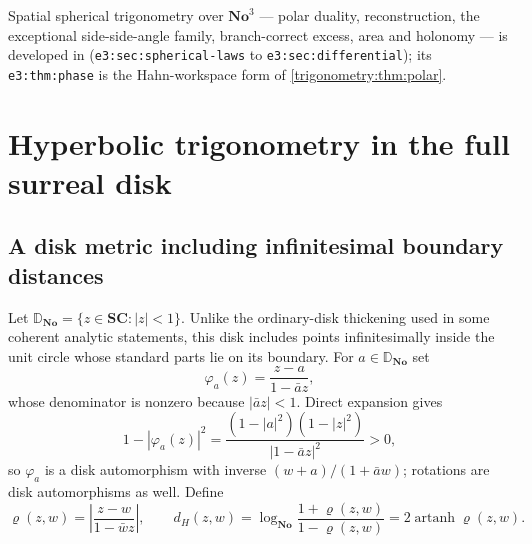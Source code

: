 \documentclass[11pt,letterpaper]{article}
\numberwithin{equation}{section}
\theoremstyle{definition}
\theoremstyle{remark}
\newcommand{\No}{\mathbf{No}}
\newcommand{\SC}{\mathbf{SC}}
\newcommand{\Dd}{\mathbb D}
\newcommand{\artanh}{\operatorname{artanh}}
\begin{document}
{\raggedright Spatial spherical trigonometry over $\No^3$ --- polar duality, reconstruction,
the exceptional side-side-angle family, branch-correct excess, area and
holonomy --- is developed in 
(\texttt{e3:sec:spherical-laws} to \texttt{e3:sec:differential}); its
\texttt{e3:thm:phase} is the Hahn-workspace form of
\cref{trigonometry:thm:polar}.\par}
\section{Hyperbolic trigonometry in the full surreal disk}
\label{trigonometry:sec:hyperbolic}

\subsection{A disk metric including infinitesimal boundary distances}
Let $\Dd_{\No}=\{z\in\SC:|z|<1\}$. Unlike the ordinary-disk thickening used in some coherent
analytic statements, this disk includes points infinitesimally inside the unit circle whose
standard parts lie on its boundary. For $a\in\Dd_{\No}$ set
\begin{equation}\label{trigonometry:eq:diskmap}
 \varphi_a(z)=\frac{z-a}{1-\bar az},
\end{equation}
whose denominator is nonzero because $|\bar az|<1$. Direct expansion gives
\begin{equation}\label{trigonometry:eq:diskidentity}
 1-|\varphi_a(z)|^2=\frac{(1-|a|^2)(1-|z|^2)}{|1-\bar az|^2}>0,
\end{equation}
so $\varphi_a$ is a disk automorphism with inverse $(w+a)/(1+\bar aw)$; rotations are disk
automorphisms as well. Define
\begin{equation}\label{trigonometry:eq:diskdistance}
 \varrho(z,w)=\left|\frac{z-w}{1-\bar wz}\right|,\qquad
 d_H(z,w)=\log_{\No}\frac{1+\varrho(z,w)}{1-\varrho(z,w)}=2\artanh\varrho(z,w).
\end{equation}
\end{document}
